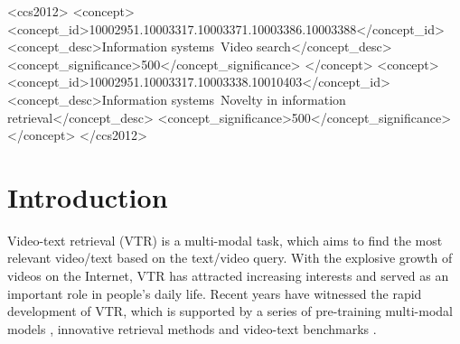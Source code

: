 \documentclass[sigconf]{acmart}
\begin{document}


\begin{CCSXML}
<ccs2012>
   <concept>
       <concept_id>10002951.10003317.10003371.10003386.10003388</concept_id>
       <concept_desc>Information systems~Video search</concept_desc>
       <concept_significance>500</concept_significance>
       </concept>
   <concept>
       <concept_id>10002951.10003317.10003338.10010403</concept_id>
       <concept_desc>Information systems~Novelty in information retrieval</concept_desc>
       <concept_significance>500</concept_significance>
       </concept>
 </ccs2012>
\end{CCSXML}






\maketitle

\section{Introduction} \label{sec:intro}

Video-text retrieval (VTR) is a multi-modal task, which aims to find the most relevant video/text based on the text/video query. With the explosive growth of videos on the Internet, VTR has attracted increasing interests and served as an important role in people's daily life. Recent years have witnessed the rapid development of VTR, which is supported by a series of pre-training multi-modal models \cite{radford2021learning,lei2021less,bain2021frozen}, innovative retrieval methods \cite{yu2018joint,zhu2020actbert,lei2021less,liu2019use,gabeur2020multi,dzabraev2021mdmmt,mithun2018learning,zhang2018cross,liu2021hit,dong2019dual,bertasius2021space,arnab2021vivit,luo2021clip4clip,DBLP:conf/sigir/JinZZZHZ21,DBLP:conf/sigir/YangD0W0C20,DBLP:conf/cvpr/WangZ021} and video-text benchmarks \cite{caba2015activitynet,xu2016msr,chen2011collecting,rohrbach2015long,anne2017localizing}.
\end{document}

